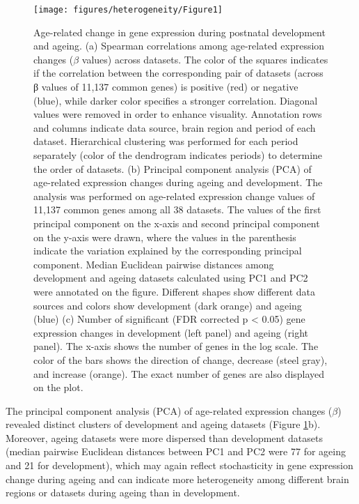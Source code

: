 \documentclass[12pt,twoside]{unicam}
\begin{document}
\begin{figure}

{\centering \texttt{[image: figures/heterogeneity/Figure1]} 

}

\caption[Age-related change in gene expression during postnatal development and ageing]{Age-related change in gene expression during postnatal development and ageing. (a) Spearman correlations among age-related expression changes ($\beta$  values) across datasets. The color of the squares indicates if the correlation between the corresponding pair of datasets (across β values of 11,137 common genes) is positive (red) or negative (blue), while darker color specifies a stronger correlation. Diagonal values were removed in order to enhance visuality. Annotation rows and columns indicate data source, brain region and period of each dataset. Hierarchical clustering was performed for each period separately (color of the dendrogram indicates periods) to determine the order of datasets. (b) Principal component analysis (PCA) of age-related expression changes during ageing and development. The analysis was performed on age-related expression change values of 11,137 common genes among all 38 datasets. The values of the first principal component on the x-axis and second principal component on the y-axis were drawn, where the values in the parenthesis indicate the variation explained by the corresponding principal component. Median Euclidean pairwise distances among development and ageing datasets calculated using PC1 and PC2 were annotated on the figure. Different shapes show different data sources and colors show development (dark orange) and ageing (blue) (c) Number of significant (FDR corrected p < 0.05) gene expression changes in development (left panel) and ageing (right panel). The x-axis shows the number of genes in the log scale. The color of the bars shows the direction of change, decrease (steel gray), and increase (orange). The exact number of genes are also displayed on the plot.}\label{fig:hetFig1}
\end{figure}

The principal component analysis (PCA) of age-related expression changes (\(\beta\)) revealed distinct clusters of development and ageing datasets (Figure \ref{fig:hetFig1}b). Moreover, ageing datasets were more dispersed than development datasets (median pairwise Euclidean distances between PC1 and PC2 were 77 for ageing and 21 for development), which may again reflect stochasticity in gene expression change during ageing and can indicate more heterogeneity among different brain regions or datasets during ageing than in development.
\end{document}
